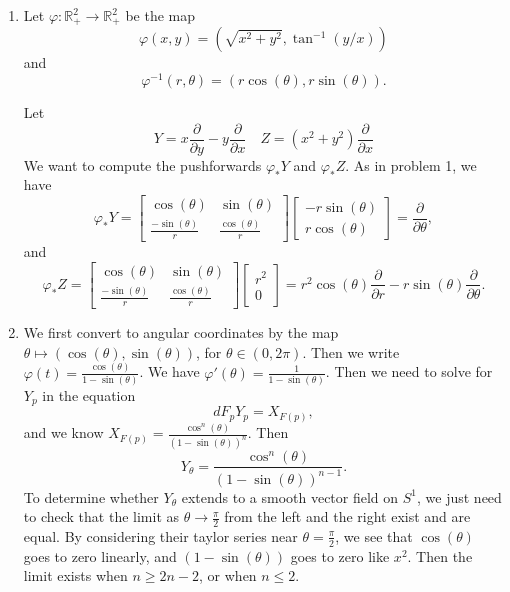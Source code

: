 \documentclass[11pt, reqno]{article}
\theoremstyle{plain}
\theoremstyle{definition}
\theoremstyle{remark}
\renewcommand{\phi}{\varphi}
\newcommand{\RR}{\mathbb{R}}
\begin{document}
\begin{enumerate}
    \item[2.] Let $\phi: \RR^2_+ \to \RR^2_+$ be the map
    \[
        \phi(x,y) = (\sqrt{x^2 + y^2}, \tan^{-1}(y/x))
    \]
    and
    \[
        \phi^{-1}(r, \theta) = (r\cos(\theta), r\sin(\theta)).
    \]

    Let 
    \[
        Y = x \frac{\partial}{\partial y} - y \frac{\partial}{\partial x} \quad Z = (x^2 + y^2) \frac{\partial}{\partial x}
    \]
    We want to compute the pushforwards $\phi_* Y$ and $\phi_* Z$. As in problem 1, we have
    \[
        \phi_* Y = \begin{bmatrix}\cos(\theta) & \sin(\theta) \\ \frac{-\sin(\theta)}{r} & \frac{\cos(\theta)}{r}\end{bmatrix}
        \begin{bmatrix}-r\sin(\theta)\\ r\cos(\theta)\end{bmatrix} = \frac{\partial}{\partial \theta},
    \]
    and  
    \[
        \phi_* Z = \begin{bmatrix}\cos(\theta) & \sin(\theta) \\ \frac{-\sin(\theta)}{r} & \frac{\cos(\theta)}{r}\end{bmatrix}
        \begin{bmatrix}r^2 \\ 0\end{bmatrix} = r^2\cos(\theta)\frac{\partial}{\partial r} - r\sin(\theta)\frac{\partial}{\partial \theta}.
    \]

    \item[3.] We first convert to angular coordinates by the map $\theta \mapsto (\cos(\theta), \sin(\theta))$, for $\theta \in (0, 2\pi)$.
    Then we write $\phi(t) = \frac{\cos(\theta)}{1 - \sin(\theta)}$. We have $\phi'(\theta) = \frac{1}{1 - \sin(\theta)}$. Then
    we need to solve for $Y_p$ in the equation 
    \[  
        dF_p Y_p = X_{F(p)},
    \]
    and we know $X_{F(p)} = \frac{\cos^n(\theta)}{(1-\sin(\theta))^n}$. Then 
    \[
        Y_\theta = \frac{\cos^n(\theta)}{(1-\sin(\theta))^{n-1}}.
    \]
    To determine whether $Y_\theta$ extends to a smooth vector field on $S^1$, we just need to check that the limit as $\theta \to \frac{\pi}{2}$
    from the left and the right exist and are equal. By considering their taylor series near $\theta = \frac{\pi}{2}$, we see that 
    $\cos(\theta)$ goes to zero linearly, and $(1-\sin(\theta))$ goes to zero like $x^2$. Then the limit exists when $n \geq 2n - 2$, 
    or when $n \leq 2$. 


\end{enumerate}
\end{document}
